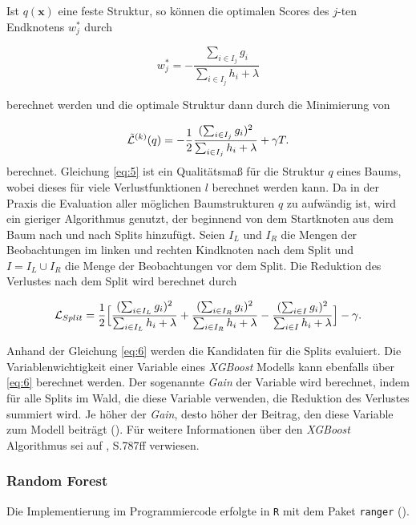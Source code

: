 \documentclass[a4paper,11pt]{article}
\begin{document}
Ist $q(\bm{x})$ eine feste Struktur, so können die optimalen Scores des $j$-ten Endknotens $w_j^*$ durch

\[ w_j^* = - \frac{\sum_{i \in I_j}g_i}{\sum_{i \in I_j}h_i + \lambda} \]

berechnet werden und die optimale Struktur dann durch die Minimierung von 

\begin{equation}\label{eq:5}
    \Tilde{\mathcal{L}}^{(k)}(q) = -\frac{1}{2} \frac{(\sum_{i \in I_j}g_i)^2}{\sum_{i \in I_j}h_i + \lambda} + \gamma T. 
\end{equation}{} 
 berechnet. Gleichung \ref{eq:5} ist ein Qualitätsmaß für die Struktur $q$ eines Baums, wobei dieses für viele Verlustfunktionen $l$ berechnet werden kann.
 Da in der Praxis die Evaluation aller möglichen Baumstrukturen $q$ zu aufwändig ist, wird ein gieriger Algorithmus genutzt, der beginnend von dem Startknoten aus dem Baum nach und nach Splits hinzufügt. Seien $I_L$ und $I_R$ die Mengen der Beobachtungen im linken und rechten Kindknoten nach dem Split und $I = I_L \cup I_R$ die Menge der Beobachtungen vor dem Split. Die Reduktion des Verlustes nach dem Split wird berechnet durch
 
 \begin{equation}\label{eq:6}
    \mathcal{L}_{Split} = \frac{1}{2} \Bigl[ \frac{(\sum_{i \in I_L}g_i)^2}{\sum_{i \in I_L}h_i + \lambda} + \frac{(\sum_{i \in I_R}g_i)^2}{\sum_{i \in I_R}h_i + \lambda} - \frac{(\sum_{i \in I}g_i)^2}{\sum_{i \in I}h_i + \lambda} \Bigr] - \gamma . 
\end{equation}{} 

Anhand der Gleichung \ref{eq:6} werden die Kandidaten für die Splits evaluiert. Die Variablenwichtigkeit einer Variable eines \textit{XGBoost} Modells kann ebenfalls über \ref{eq:6} berechnet werden. Der sogenannte \textit{Gain} der Variable wird berechnet, indem für alle Splits im Wald, die diese Variable verwenden, die Reduktion des Verlustes summiert wird. Je höher der \textit{Gain}, desto höher der Beitrag, den diese Variable zum Modell beiträgt (\cite{XGBoostR}). Für weitere Informationen über den \textit{XGBoost} Algorithmus sei auf \cite{XGBoost}, S.787ff verwiesen.


\subsubsection{Random Forest}\label{kap:RF}

Die Implementierung im Programmiercode erfolgte in \texttt{R} mit dem Paket \texttt{ranger} (\cite{ranger}).\\
\end{document}
